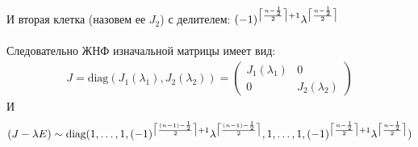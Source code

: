 		И вторая клетка (назовем ее $J_2$)  с делителем: $(-1)^{\ceil[\big]{\frac{n-\frac{1}{2}}{2}} + 1}\lambda^{\ceil[\big]{\frac{n-\frac{1}{2}}{2}}}$\\
		\\
		Следовательно ЖНФ изначальной матрицы имеет вид:
		\begin{gather*}
			J = \text{diag}(J_1(\lambda_1), J_2(\lambda_2)) = 
			\begin{pmatrix}
				J_1(\lambda_1) & 0\\
				0 & J_2(\lambda_2)
			\end{pmatrix}
		\end{gather*}
		И
		\begin{gather*}
			(J - \lambda E) \sim \text{diag}(1,\ldots,1,(-1)^{\ceil[\big]{\frac{(n-1)-\frac{1}{2}}{2}} + 1}\lambda^{\ceil[\big]{\frac{(n-1)-\frac{1}{2}}{2}}}, 1, \ldots,1, (-1)^{\ceil[\big]{\frac{n-\frac{1}{2}}{2}} + 1}\lambda^{\ceil[\big]{\frac{n-\frac{1}{2}}{2}}})
		\end{gather*}
		